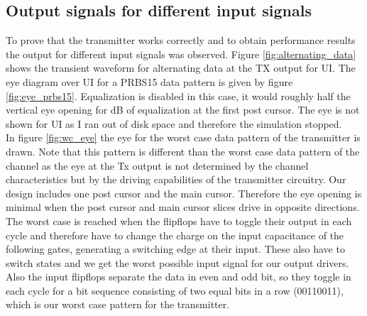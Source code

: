\subsection{Output signals for different input signals}

To prove that the transmitter works correctly and to obtain performance results the output for different input signals was observed. Figure \ref{fig:alternating_data} shows the transient waveform for alternating data at the TX output for \unit[6]{UI}. The eye diagram over \unit[2940]{UI} for a PRBS15 data pattern is given by figure \ref{fig:eye_prbs15}. Equalization is disabled in this case, it would roughly half the vertical eye opening for \unit[6]{dB} of equalization at the first post cursor. The eye is not shown for \unit[10000]{UI} as I ran out of disk space and therefore the simulation stopped.\\
In figure \ref{fig:wc_eye} the eye for the worst case data pattern of the transmitter is drawn. Note that this pattern is different than the worst case data pattern of the channel as the eye at the Tx output is not determined by the channel characteristics but by the driving capabilities of the transmitter circuitry. Our design includes one post cursor and the main cursor. Therefore the eye opening is minimal when the post cursor and main cursor slices drive in opposite directions. The worst case is reached when the flipflops have to toggle their output in each cycle and therefore have to change the charge on the input capacitance of the following gates, generating a switching edge at their input. These also have to switch states and we get the worst possible input signal for our output drivers. Also the input flipflops separate the data in even and odd bit, so they toggle in each cycle for a bit sequence consisting of two equal bits in a row (00110011), which is our worst case pattern for the transmitter.

